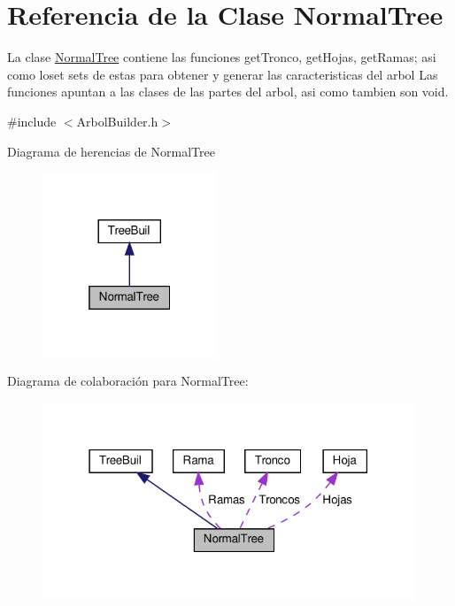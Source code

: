 \hypertarget{classNormalTree}{}\section{Referencia de la Clase Normal\+Tree}
\label{classNormalTree}


La clase \hyperlink{classNormalTree}{Normal\+Tree} contiene las funciones get\+Tronco, get\+Hojas, get\+Ramas; asi como loset sets de estas para obtener y generar las caracteristicas del arbol  Las funciones apuntan a las clases de las partes del arbol, asi como tambien son void.  




{\ttfamily \#include $<$Arbol\+Builder.\+h$>$}



Diagrama de herencias de Normal\+Tree\nopagebreak
\begin{figure}[H]
\begin{center}
\leavevmode
\includegraphics[width=148pt]{classNormalTree__inherit__graph}
\end{center}
\end{figure}


Diagrama de colaboración para Normal\+Tree\+:\nopagebreak
\begin{figure}[H]
\begin{center}
\leavevmode
\includegraphics[width=315pt]{classNormalTree__coll__graph}
\end{center}
\end{figure}
